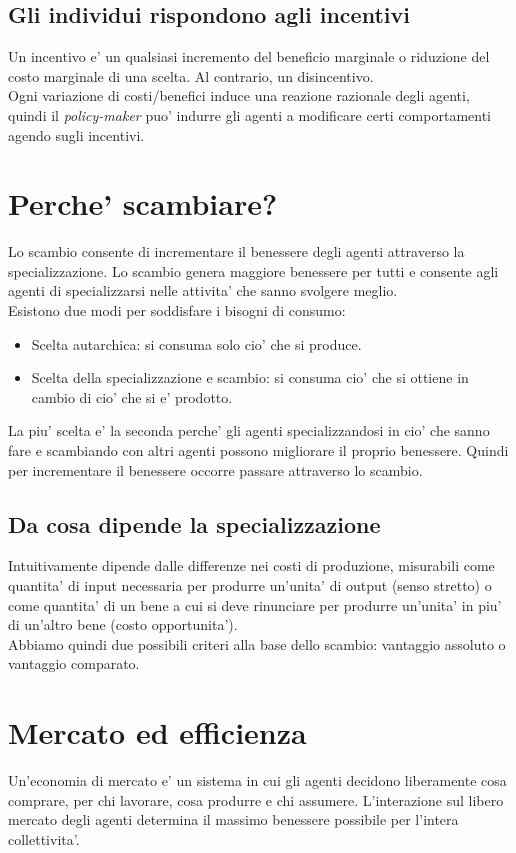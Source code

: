 \documentclass{report}
\begin{document}
	\subsection{Gli individui rispondono agli incentivi}
	Un incentivo e' un qualsiasi incremento del beneficio marginale o riduzione del costo marginale di una scelta. Al contrario, un disincentivo.\\Ogni variazione di costi/benefici induce una reazione razionale degli agenti, quindi il \textit{policy-maker} puo' indurre gli agenti a modificare certi comportamenti agendo sugli incentivi.
	\section{Perche' scambiare?}
	Lo scambio consente di incrementare il benessere degli agenti attraverso la specializzazione. Lo scambio genera maggiore benessere per tutti e consente agli agenti di specializzarsi nelle attivita' che sanno svolgere meglio.
	\medskip \\
	Esistono due modi per soddisfare i bisogni di consumo:
	\begin{itemize}
		\item Scelta autarchica: si consuma solo cio' che si produce.
		\item Scelta della specializzazione e scambio: si consuma cio' che si ottiene in cambio di cio' che si e' prodotto.
	\end{itemize}
	La piu' scelta e' la seconda perche' gli agenti specializzandosi in cio' che sanno fare e scambiando con altri agenti possono migliorare il proprio benessere. Quindi per incrementare il benessere occorre passare attraverso lo scambio.
	\subsection{Da cosa dipende la specializzazione}
	Intuitivamente dipende dalle differenze nei costi di produzione, misurabili come quantita' di input necessaria per produrre un'unita' di output (senso stretto) o come quantita' di un bene a cui si deve rinunciare per produrre un'unita' in piu' di un'altro bene (costo opportunita').
	\medskip \\ Abbiamo quindi due possibili criteri alla base dello scambio: vantaggio assoluto o vantaggio comparato.
	\section{Mercato ed efficienza}
	Un'economia di mercato e' un sistema in cui gli agenti decidono liberamente cosa comprare, per chi lavorare, cosa produrre e chi assumere. L'interazione sul libero mercato degli agenti determina il massimo benessere possibile per l'intera collettivita'.
\end{document}
